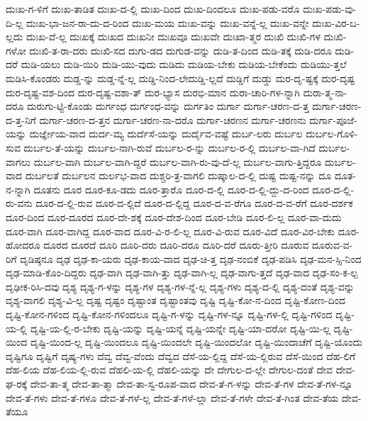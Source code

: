 {ದುಃಖ-ಗ-ಳಿಗೆ
ದುಃಖ-ತಾಡಿತ
ದುಃಖ-ದ-ಲ್ಲಿ
ದುಃಖ-ದಿಂದ
ದುಃಖ-ದಿಂದಲೂ
ದುಃಖ-ಪಡು-ವರೊ
ದುಃಖ-ಪಡು-ವು-ದಿ-ಲ್ಲ
ದುಃಖ-ಭಾ-ಜನ-ರಾ-ದು-ದ-ರಿಂದ
ದುಃಖ-ಮಯ
ದುಃಖ-ವನ್ನು
ದುಃಖ-ವನ್ನೆ-ಲ್ಲ
ದುಃಖ-ವನ್ನೇ
ದುಃಖ-ವಿರ-ಬ-ಲ್ಲದು
ದುಃಖ-ವೆ-ಲ್ಲ
ದುಃಖಕ್ಕೆ
ದುಃಖದ
ದುಃಖನೀ
ದುಃಖವೂ
ದುಃಖವೇ
ದುಃಖಾ-ತ್ಮರ
ದುಃಖಿ
ದುಃಖಿ-ಗಳ
ದುಃಖಿ-ಗಳೋ
ದುಃಖಿ-ತ-ರಾ-ದರು
ದುಃಖಿ-ಸದ
ದುಗು-ಡದ
ದುಗುಡ-ವನ್ನು
ದುಡಿ-ತ-ದಿಂದ
ದುಡಿ-ತಕ್ಕೆ
ದುಡಿ-ದರೂ
ದುಡಿ-ದರೆ
ದುಡಿ-ಯಲು
ದುಡಿ-ಯಿರಿ
ದುಡಿ-ಯು-ವುದು
ದುಡಿದು
ದುಡಿಯ-ಬೇಕು
ದುಡಿಯ-ಬೇಕೆಂದು
ದುಡಿಯು-ತ್ತಲೆ
ದುಡಿಸಿ-ಕೊಂಡರು
ದುಡ್ಡ-ನ್ನು
ದುಡ್ಡ-ನ್ನೆ-ಲ್ಲ
ದುಡ್ಡಿ-ನಿಂದ-ಲೇದುಡ್ಡಿ-ಲ್ಲದೆ
ದುಡ್ಡಿಗೆ
ದುಡ್ಡು
ದುರ-ದೃ-ಷ್ಟಕ್ಕೆ
ದುರ-ದೃಷ್ಟ
ದುರ-ದೃಷ್ಟ-ವಶ-ದಿಂದ
ದುರ-ದೃಷ್ಟ-ವಶಾ-ತ್
ದುರ-ಭ್ಯಾಸ
ದುರಭಿ-ಮಾನ
ದುರಾ-ಚಾರಿ-ಗಳ-ನ್ನಾಗಿ
ದುರಾ-ತ್ಮ-ನಾ-ದರೂ
ದುರುಗು-ಟ್ಟಿ-ಕೊಂಡು
ದುರ್ಗಂಧ
ದುರ್ಗಂಧ-ವನ್ನು
ದುರ್ಗತಿಂ
ದುರ್ಗಾ
ದುರ್ಗಾ-ಚರಣ-ದ-ತ್ತ
ದುರ್ಗಾ-ಚರಣ-ದ-ತ್ತ-ನಿಗೆ
ದುರ್ಗಾ-ಚರಣ-ದ-ತ್ತನ
ದುರ್ಗಾ-ಚರಣ-ನಾ-ದರೊ
ದುರ್ಗಾ-ಚರಣನ
ದುರ್ಗಾ-ಚರಣನು
ದುರ್ಗಾ-ಪೂಜೆ-ಯನ್ನು
ದುರ್ಜ್ಞೇಯ-ವಾದ
ದುರ್ದ-ಮ್ಯ
ದುರ್ದೆಸೆ-ಯನ್ನು
ದುರ್ದೈವ-ವಷ್ಟೆ
ದುರ್ಬ-ಲರು
ದುರ್ಬಲ
ದುರ್ಬಲ-ಗೊಳಿ-ಸುವ
ದುರ್ಬಲ-ತೆ-ಯನ್ನು
ದುರ್ಬಲ-ನಾಗಿ-ರುವೆ
ದುರ್ಬಲ-ರ-ನ್ನು
ದುರ್ಬಲ-ರ-ಲ್ಲಿ
ದುರ್ಬಲ-ವಾ-ಗಿದೆ
ದುರ್ಬಲ-ವಾಗಲು
ದುರ್ಬಲ-ವಾಗಿ
ದುರ್ಬಲ-ವಾಗಿ-ದ್ದರೆ
ದುರ್ಬಲ-ವಾಗಿ-ರು-ವು-ದೆ-ಲ್ಲ
ದುರ್ಬಲ-ವಾಗು-ತ್ತಿದ್ದರೂ
ದುರ್ಬಲ-ವಾದ
ದುರ್ಬಲತೆ
ದುರ್ಬಲನ
ದುರ್ಲಭ-ವಾದ
ದುಶ್ಚರಿ-ತ್ರ-ವಾಗಲಿ
ದುಷ್ಕಾಲ-ದ-ಲ್ಲಿ
ದುಷ್ಟ
ದುಷ್ಟ-ನನ್ನು
ದೂ
ದೂತ-ನ-ನ್ನಾಗಿ
ದೂತನು
ದೂರ
ದೂರ-ಕೂ-ಡದು
ದೂರ-ತ್ತಾರೊ
ದೂರ-ದ-ಲ್ಲಿ
ದೂರ-ದ-ಲ್ಲಿ-ದ್ದು-ದ-ರಿಂದ
ದೂರ-ದ-ಲ್ಲಿ-ರು-ವನು
ದೂರ-ದ-ಲ್ಲಿ-ರುವ
ದೂರ-ದ-ಲ್ಲಿದೆ
ದೂರ-ದ-ಲ್ಲಿದ್ದ
ದೂರ-ದ-ವ-ರೆಗೂ
ದೂರ-ದ-ವ-ರೆಗೆ
ದೂರ-ದರ್ಶಕ
ದೂರ-ದಿಂದ
ದೂರ-ದೂರದ
ದೂರ-ದೇ-ಶಕ್ಕೆ
ದೂರ-ದೇಶ-ದಿಂದ
ದೂರ-ಬೇಡಿ
ದೂರ-ಲಿ-ಲ್ಲ
ದೂರ-ವಾ-ದುದು
ದೂರ-ವಾಗಿ
ದೂರ-ವಾಗಿದ್ದ
ದೂರ-ವಾದ
ದೂರ-ವಿ-ರ-ಲಿ-ಲ್ಲ
ದೂರ-ವಿ-ರುವ
ದೂರ-ವಿದೆ
ದೂರ-ವಿರ-ಬೇಕು
ದೂರ-ಹೋದರೂ
ದೂರದ
ದೂರದೆ
ದೂರಿ
ದೂರಿ-ದರು
ದೂರಿ-ದರೂ
ದೂರಿ-ದರೆ
ದೂರು-ತ್ತೀರಿ
ದೂರುವ
ದೂರುವ-ವ-ರಿಗೆ
ದೃಡಿಷ್ಠನೂ
ದೃಢ
ದೃಢ-ಕಾ-ಯರು
ದೃಢ-ಕಾಯ-ವಾದ
ದೃಢ-ಚಿ-ತ್ತ
ದೃಢ-ನಂಬಿಕೆ
ದೃಢ-ಪಡಿಸಿ
ದೃಢ-ಮನ-ಸ್ಸಿ-ನಿಂದ
ದೃಢ-ಮಾಡಿ-ಕೊಂ-ದಿದ್ದರು
ದೃಢ-ವಾಗಿ
ದೃಢ-ವಾಗಿ-ತ್ತು
ದೃಢ-ವಾಗಿ-ಲ್ಲ
ದೃಢ-ವಾಗು-ತ್ತದೆ
ದೃಢ-ವಾದ
ದೃಢ-ಸಂ-ಕ-ಲ್ಪ
ದೃಢೀಕ-ರಿಸಿ-ದವು
ದೃಶ್ಯ
ದೃಶ್ಯ-ಗ-ಳನ್ನು
ದೃಶ್ಯ-ಗಳ
ದೃಶ್ಯ-ಗಳ-ನ್ನೆ-ಲ್ಲ
ದೃಶ್ಯ-ಗಳು
ದೃಶ್ಯ-ದ-ಲ್ಲಿ
ದೃಶ್ಯ-ದಂತೆ
ದೃಶ್ಯ-ವನ್ನು
ದೃಶ್ಯ-ವಾಗಲಿ
ದೃಶ್ಯ-ವಿ-ಲ್ಲ
ದೃಷ್ಟ
ದೃಷ್ಟಂ
ದೃಷ್ಟಾಂತ
ದೃಷ್ಟಾಂತವು
ದೃಷ್ಟಿ
ದೃಷ್ಟಿ-ಕೋ-ನ-ದಿಂದ
ದೃಷ್ಟಿ-ಕೋಣ-ದಿಂದ
ದೃಷ್ಟಿ-ಕೋನ-ಗಳಿಂದ
ದೃಷ್ಟಿ-ಕೋನ-ಗಳಿಂದಲೂ
ದೃಷ್ಟಿ-ಗ-ಳನ್ನು
ದೃಷ್ಟಿ-ಗಳ-ನ್ನೂ
ದೃಷ್ಟಿ-ಗಳ-ಲ್ಲಿ
ದೃಷ್ಟಿ-ಗಳಿಂದ
ದೃಷ್ಟಿ-ಯ-ಲ್ಲಿ
ದೃಷ್ಟಿ-ಯ-ಲ್ಲಿ-ರ-ಬೇಕು
ದೃಷ್ಟಿ-ಯನ್ನು
ದೃಷ್ಟಿ-ಯನ್ನೆ
ದೃಷ್ಟಿ-ಯನ್ನೇ
ದೃಷ್ಟಿ-ಯಾ-ದರೋ
ದೃಷ್ಟಿ-ಯಿ-ಲ್ಲ
ದೃಷ್ಟಿ-ಯಿಂದ
ದೃಷ್ಟಿ-ಯಿಂದ-ಲ್ಲ
ದೃಷ್ಟಿ-ಯಿಂದಲೂ
ದೃಷ್ಟಿ-ಯಿಂದಲೇ
ದೃಷ್ಟಿ-ಯಿಂದಲೋ
ದೃಷ್ಟಿ-ಯಿಂದಾಚೆಗೆ
ದೃಷ್ಟಿ-ಯೊಂದು
ದೃಷ್ಟಿಗೂ
ದೃಷ್ಟಿಗೆ
ದೃಷ್ಯ-ಗಳು
ದೆವ್ವ
ದೆವ್ವ-ವೆಂದು
ದೆವ್ವದ
ದೆಸೆ-ಯ-ಲ್ಲಿದ್ದ
ದೆಸೆ-ಯ-ಲ್ಲಿರುವ
ದೆಸೆ-ಯಿಂದ
ದೆಹ-ಲಿಗೆ
ದೆಹ-ಲಿಯ
ದೆಹ-ಲಿಯ-ಲ್ಲಿ-ರುವ
ದೆಹಲಿ-ಯ-ಲ್ಲಿ
ದೆಹಲಿ-ಯನ್ನು
ದೇ
ದೇಗುಲ-ದ-ಲ್ಲೇ
ದೇಗುಲ-ದಂತೆ
ದೇವ
ದೇವ-ಘ-ರಕ್ಕೆ
ದೇವ-ತಾ-ತ್ಮ
ದೇವ-ತಾ-ತ್ಮಾ
ದೇವ-ತಾ-ಸ್ವ-ರೂಪ-ವಾದ
ದೇವ-ತೆ-ಗ-ಳನ್ನು
ದೇವ-ತೆ-ಗಳ
ದೇವ-ತೆ-ಗಳ-ನ್ನೂ
ದೇವ-ತೆ-ಗಳು
ದೇವ-ತೆ-ಗಳೂ
ದೇವ-ತೆ-ಗಳೆ-ಲ್ಲ
ದೇವ-ತೆ-ಗಳೆ-ಲ್ಲಾ
ದೇವ-ತೆ-ಗಳೇ
ದೇವ-ತೆ-ಗಿಂತ
ದೇವ-ತೆಯ
ದೇವ-ತೆಯೂ
}
